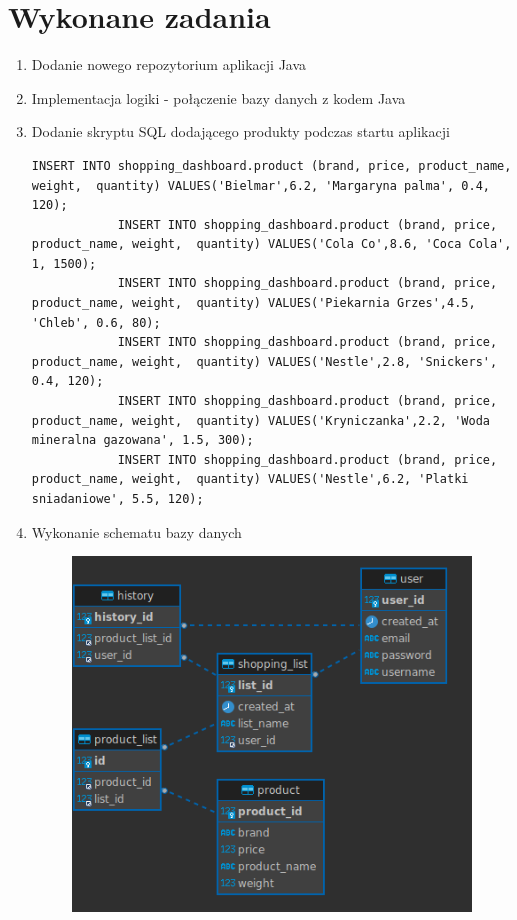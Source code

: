 \documentclass[12pt]{article}
\begin{document}
	\section{Wykonane zadania}
	\begin{enumerate}
		\item Dodanie nowego repozytorium aplikacji Java
		\item Implementacja logiki - połączenie bazy danych z kodem Java
		\item Dodanie skryptu SQL dodającego produkty podczas startu aplikacji
		\begin{lstlisting}[style=sqlStyle, caption=data.sql, label=lst:sqlCode]
			INSERT INTO shopping_dashboard.product (brand, price, product_name, weight,  quantity) VALUES('Bielmar',6.2, 'Margaryna palma', 0.4, 120);
			INSERT INTO shopping_dashboard.product (brand, price, product_name, weight,  quantity) VALUES('Cola Co',8.6, 'Coca Cola', 1, 1500);
			INSERT INTO shopping_dashboard.product (brand, price, product_name, weight,  quantity) VALUES('Piekarnia Grzes',4.5, 'Chleb', 0.6, 80);
			INSERT INTO shopping_dashboard.product (brand, price, product_name, weight,  quantity) VALUES('Nestle',2.8, 'Snickers', 0.4, 120);
			INSERT INTO shopping_dashboard.product (brand, price, product_name, weight,  quantity) VALUES('Kryniczanka',2.2, 'Woda mineralna gazowana', 1.5, 300);
			INSERT INTO shopping_dashboard.product (brand, price, product_name, weight,  quantity) VALUES('Nestle',6.2, 'Platki sniadaniowe', 5.5, 120);
		\end{lstlisting}
		\item Wykonanie schematu bazy danych
		\begin{figure}[H]
			\centering
			\includegraphics{schemat_mysql}
			\label{fig:schematmysql}
		\end{figure}


\end{enumerate}
\end{document}
